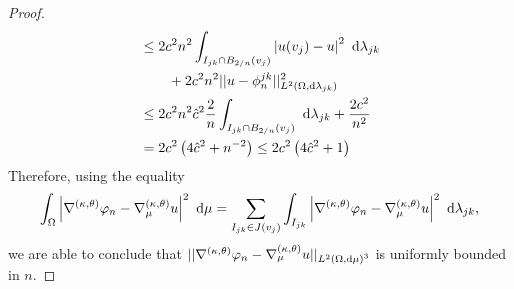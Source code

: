 \begin{proof}
\begin{align*}
		&\leq 2c^2 n^2\int_{I_{jk}\cap B_{2/n}(v_j)} \left\lvert u(v_j)-u \right\rvert^2  \ \mathrm{d}\lambda_{jk} \\
		&\qquad + 2c^2n^2\lvert\lvert u-\phi_n^{jk} \rvert\rvert_{L^{2}\left( \Omega,\mathrm{d} \lambda_{jk} \right)}^2 \\
		&\leq 2c^2 n^2 \hat{c}^2 \frac{2}{n}\int_{I_{jk}\cap B_{2/n}(v_j)} \ \mathrm{d}\lambda_{jk} + \frac{2c^2}{n^2} \\
		&= 2c^2 \left(  4\hat{c}^2 + n^{-2}  \right) \leq 2c^2 \left(  4\hat{c}^2 + 1  \right)
	\end{align*}
	Therefore, using the equality
	\begin{align*}
		\int_{\Omega} \left\lvert \nabla^{\left( \kappa, \theta \right)}\varphi_n - \nabla^{\left( \kappa, \theta \right)}_{\mu}u \right\rvert^2  \ \mathrm{d}\mu = \sum_{I_{jk}\in J(v_j)} \int_{I_{jk}} \left\lvert \nabla^{\left( \kappa, \theta \right)}\varphi_n - \nabla^{\left( \kappa, \theta \right)}_{\mu}u \right\rvert^2  \ \mathrm{d}\lambda_{jk},
	\end{align*}
	we are able to conclude that $\lvert\lvert \nabla^{\left( \kappa, \theta \right)}\varphi_n-\nabla^{\left( \kappa, \theta \right)}_{\mu}u \rvert\rvert_{L^{2}\left( \Omega,\mathrm{d} \mu \right)^3}$ is uniformly bounded in $n$.
	

\end{proof}
